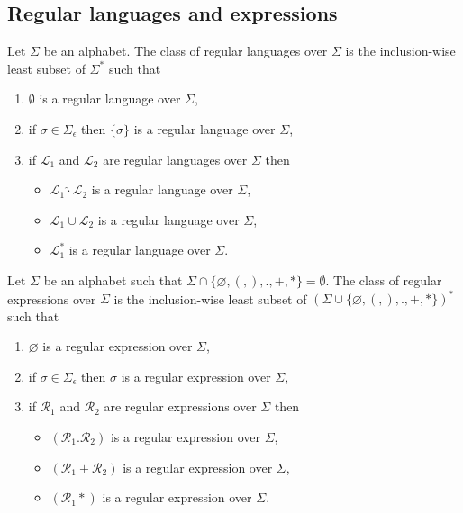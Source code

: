 \subsection{Regular languages and expressions}

\begin{definition}
	Let $\Sigma$ be an alphabet. The class of regular languages over $\Sigma$ is
	the inclusion-wise least subset of $\Sigma^*$ such that
	\begin{enumerate}
		\item $\emptyset$ is a regular language over $\Sigma$,
		\item if $\sigma \in \Sigma_\epsilon$ then $\{ \sigma \}$ is a
			regular language over $\Sigma$,
		\item if $\mathcal{L}_1$ and $\mathcal{L}_2$ are regular languages
			over $\Sigma$ then
			\begin{itemize}
				\item $\mathcal{L}_1 \hat{\cdot} \mathcal{L}_2$ is a
					regular language over $\Sigma$,
				\item $\mathcal{L}_1 \cup \mathcal{L}_2$ is a
					regular language over $\Sigma$,
				\item $\mathcal{L}_1^*$ is a regular language over
					$\Sigma$.
			\end{itemize}
	\end{enumerate}
\end{definition}

\begin{definition}
	Let $\Sigma$ be an alphabet such that $\Sigma \cap \{ \varnothing, (, ), .,
	+, * \} = \emptyset$. The class of regular expressions over $\Sigma$ is the
	inclusion-wise least subset of $(\Sigma \cup \{ \varnothing, (, ), ., +, *
	\})^*$ such that
	\begin{enumerate}
		\item $\varnothing$ is a regular expression over $\Sigma$,
		\item if $\sigma \in \Sigma_\epsilon$ then $\sigma$ is a regular
			expression over $\Sigma$,
		\item if $\mathcal{R}_1$ and $\mathcal{R}_2$ are regular expressions
			over $\Sigma$ then
			\begin{itemize}
				\item $(\mathcal{R}_1.\mathcal{R}_2)$ is a regular
					expression over $\Sigma$,
				\item $(\mathcal{R}_1+\mathcal{R}_2)$ is a regular
					expression over $\Sigma$,
				\item $(\mathcal{R}_1*)$ is a regular expression
					over $\Sigma$.
			\end{itemize}
	\end{enumerate}
\end{definition}

